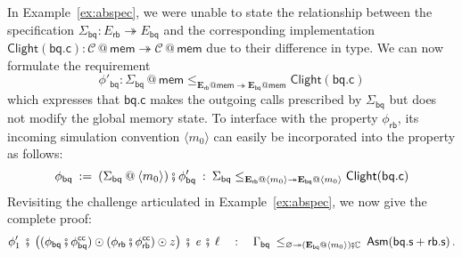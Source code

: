 \documentclass[acmsmall,nonacm]{acmart}
\newcommand{\kw}[1]{\ensuremath{ \mathsf{#1} }}
\newcommand{\vcomp}{\fatsemi}
\begin{document}
In Example~\ref{ex:abspec},
we were unable to state the relationship
between the specification
$\Sigma_\kw{bq} : E_\kw{rb} \twoheadrightarrow E_\kw{bq}$
and the corresponding implementation
$\kw{Clight}(\kw{bq.c}) : \mathcal{C} \mathbin@ \kw{mem}
 \twoheadrightarrow \mathcal{C} \mathbin@ \kw{mem}$
due to their difference in type.
We can now formulate the requirement
\[
\phi'_\kw{bq} : \Sigma_\kw{bq} \mathbin@ \kw{mem}
\le_{\mathbf{E}_\kw{rb}@\kw{mem} \twoheadrightarrow \mathbf{E}_\kw{bq}@\kw{mem}}
\kw{Clight}(\kw{bq.c})
\]%
which expresses that $\kw{bq.c}$
makes the outgoing calls prescribed by $\Sigma_\kw{bq}$
but does not modify the global memory state.
To interface with
the property $\phi_\kw{rb}$,
its incoming simulation convention
$\langle m_0 \rangle$
can easily be incorporated into the property
as follows:
\[
  \phi_\kw{bq} \: := \:
    (\Sigma_\kw{bq} \mathbin@ \langle m_0 \rangle)
    \vcomp
    \phi'_\kw{bq}
  \: : \:
  \Sigma_\kw{bq}
    \le_{\mathbf{E}_\kw{rb} \mathbin@ \langle m_0 \rangle
         \twoheadrightarrow
         \mathbf{E}_\kw{bq} \mathbin@ \langle m_0 \rangle}
    \kw{Clight}(\kw{bq.c})
\]
Revisiting the challenge articulated in Example~\ref{ex:abspec},
we now give the complete proof:
\[
  \phi'_1
  \:\vcomp\:
  \big(
  (\phi_\kw{bq} \vcomp \phi^\kw{cc}_\kw{bq}) \odot
  (\phi_\kw{rb} \vcomp \phi^\kw{cc}_\kw{rb}) \odot z
  \big)
  \:\vcomp\:
  \textit{e}
  \:\vcomp\:
  \ell
  \quad : \quad
  \Gamma_\kw{bq}
  \:
  \le_{\varnothing \twoheadrightarrow
       (\mathbf{E}_\kw{bq} \mathbin@ \langle m_0 \rangle) \vcomp \mathbb{C}}
  \:
  \kw{Asm}(\kw{bq.s} + \kw{rb.s})
  \,.
\]
\end{document}
